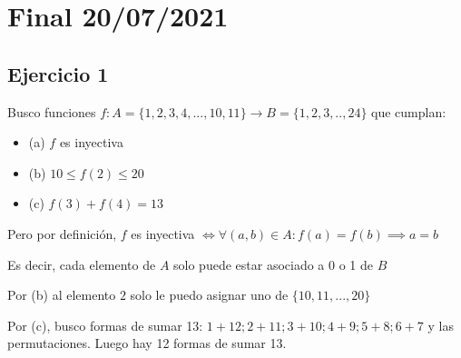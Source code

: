 
\usepackage{caratula}
\usepackage{enumerate}
\usepackage{hyperref}
\usepackage{graphicx}
\usepackage{amsfonts}
\usepackage{enumitem}
\usepackage{amsmath}

\decimalpoint
\hypersetup{colorlinks=true, linkcolor=black, urlcolor=blue}
\setlength{\parindent}{0em}
\setlength{\parskip}{0.5em}
\setcounter{tocdepth}{3} %
\setcounter{section}{0} %
\renewcommand{\thesubsubsection}{\thesubsection.\Alph{subsubsection}}
\graphicspath{ {images/} }





\maketitle
\newpage

\tableofcontents
\newpage

\section{Final 20/07/2021}

\subsection{Ejercicio 1}

Busco funciones $ f: A = \{ 1,2,3,4,...,10,11 \} \rightarrow B = \{ 1,2,3,..,24 \} $ que cumplan:
\begin{itemize}
    \item (a) $f$ es inyectiva
    \item (b) $ 10 \leq f(2) \leq 20 $
    \item (c) $ f(3) + f(4) = 13 $
\end{itemize}

Pero por definición, $f$ es inyectiva $ \iff \forall (a,b) \in A: f(a) = f(b) \implies a = b $

Es decir, cada elemento de $ A $ solo puede estar asociado a 0 o 1 de $B$

Por (b) al elemento $ 2 $ solo le puedo asignar uno de $ \{ 10,11,...,20 \} $

Por (c), busco formas de sumar 13: $ 1+12; 2+11; 3+10; 4+9; 5+8; 6+7 $ y las permutaciones. Luego hay 12 formas de sumar 13.

